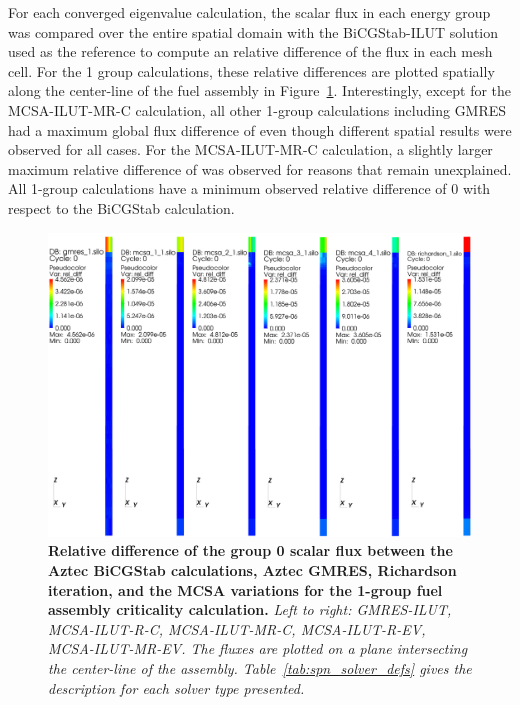 For each converged eigenvalue calculation, the scalar flux in each
energy group was compared over the entire spatial domain with the
BiCGStab-ILUT solution used as the reference to compute an relative
difference of the flux in each mesh cell. For the 1 group
calculations, these relative differences are plotted spatially along
the center-line of the fuel assembly in
Figure~\ref{fig:serial_1_group_diff}. Interestingly, except for the
MCSA-ILUT-MR-C calculation, all other 1-group calculations including
GMRES had a maximum global flux difference of  even
though different spatial results were observed for all cases. For the
MCSA-ILUT-MR-C calculation, a slightly larger maximum relative
difference of  was observed for reasons that remain
unexplained. All 1-group calculations have a minimum observed relative
difference of 0 with respect to the BiCGStab calculation.

\begin{figure}[t!]
  \begin{center}
    \includegraphics[width=6in]{chapters/spn_equations/serial_1_group.pdf}
  \end{center}
  \caption{\textbf{Relative difference of the group 0 scalar flux
      between the Aztec BiCGStab calculations, Aztec GMRES, Richardson
      iteration, and the MCSA variations for the 1-group fuel assembly
      criticality calculation.} \textit{Left to right: GMRES-ILUT,
      MCSA-ILUT-R-C, MCSA-ILUT-MR-C, MCSA-ILUT-R-EV,
      MCSA-ILUT-MR-EV. The fluxes are plotted on a plane intersecting
      the center-line of the assembly. Table~\ref{tab:spn_solver_defs}
      gives the description for each solver type presented.}}
  \label{fig:serial_1_group_diff}
\end{figure}

